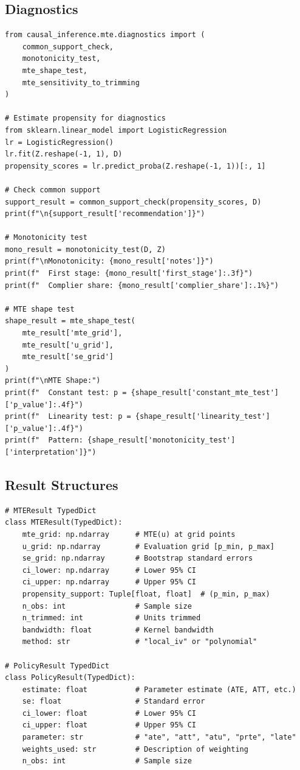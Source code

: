 \subsection{Diagnostics}

\begin{verbatim}
from causal_inference.mte.diagnostics import (
    common_support_check,
    monotonicity_test,
    mte_shape_test,
    mte_sensitivity_to_trimming
)

# Estimate propensity for diagnostics
from sklearn.linear_model import LogisticRegression
lr = LogisticRegression()
lr.fit(Z.reshape(-1, 1), D)
propensity_scores = lr.predict_proba(Z.reshape(-1, 1))[:, 1]

# Check common support
support_result = common_support_check(propensity_scores, D)
print(f"\n{support_result['recommendation']}")

# Monotonicity test
mono_result = monotonicity_test(D, Z)
print(f"\nMonotonicity: {mono_result['notes']}")
print(f"  First stage: {mono_result['first_stage']:.3f}")
print(f"  Complier share: {mono_result['complier_share']:.1%}")

# MTE shape test
shape_result = mte_shape_test(
    mte_result['mte_grid'],
    mte_result['u_grid'],
    mte_result['se_grid']
)
print(f"\nMTE Shape:")
print(f"  Constant test: p = {shape_result['constant_mte_test']['p_value']:.4f}")
print(f"  Linearity test: p = {shape_result['linearity_test']['p_value']:.4f}")
print(f"  Pattern: {shape_result['monotonicity_test']['interpretation']}")
\end{verbatim}

\subsection{Result Structures}

\begin{verbatim}
# MTEResult TypedDict
class MTEResult(TypedDict):
    mte_grid: np.ndarray      # MTE(u) at grid points
    u_grid: np.ndarray        # Evaluation grid [p_min, p_max]
    se_grid: np.ndarray       # Bootstrap standard errors
    ci_lower: np.ndarray      # Lower 95% CI
    ci_upper: np.ndarray      # Upper 95% CI
    propensity_support: Tuple[float, float]  # (p_min, p_max)
    n_obs: int                # Sample size
    n_trimmed: int            # Units trimmed
    bandwidth: float          # Kernel bandwidth
    method: str               # "local_iv" or "polynomial"

# PolicyResult TypedDict
class PolicyResult(TypedDict):
    estimate: float           # Parameter estimate (ATE, ATT, etc.)
    se: float                 # Standard error
    ci_lower: float           # Lower 95% CI
    ci_upper: float           # Upper 95% CI
    parameter: str            # "ate", "att", "atu", "prte", "late"
    weights_used: str         # Description of weighting
    n_obs: int                # Sample size
\end{verbatim}

